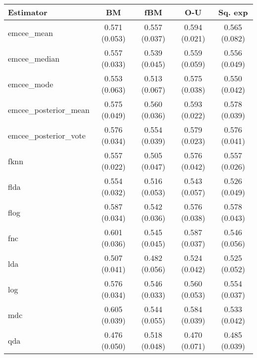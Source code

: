 \begin{table}[htbp!]
  \centering
  \begin{tabular}{lcccc}
\toprule
            \textbf{Estimator} &            \textbf{BM} &           \textbf{fBM} &           \textbf{O-U} &        \textbf{Sq. exp} \\
\midrule

          emcee\_mean & 0.571 (0.053) & 0.557 (0.037) & 0.594 (0.021) & 0.565 (0.082) \\
        emcee\_median & 0.557 (0.033) & 0.539 (0.045) & 0.559 (0.059) & 0.556 (0.049) \\
          emcee\_mode & 0.553 (0.063) & 0.513 (0.067) & 0.575 (0.038) & 0.550 (0.042) \\
emcee\_posterior\_mean & 0.575 (0.049) & 0.560 (0.036) & 0.593 (0.022) & 0.578 (0.039) \\
emcee\_posterior\_vote & 0.576 (0.034) & 0.554 (0.039) & 0.579 (0.023) & 0.576 (0.041) \\
                fknn & 0.557 (0.022) & 0.505 (0.047) & 0.576 (0.042) & 0.557 (0.026) \\
                flda & 0.554 (0.032) & 0.516 (0.053) & 0.543 (0.057) & 0.526 (0.049) \\
                flog & 0.587 (0.034) & 0.542 (0.036) & 0.576 (0.038) & 0.578 (0.043) \\
                 fnc & 0.601 (0.036) & 0.545 (0.045) & 0.587 (0.037) & 0.546 (0.056) \\
                 lda & 0.507 (0.041) & 0.482 (0.056) & 0.524 (0.042) & 0.525 (0.052) \\
                 log & 0.576 (0.034) & 0.546 (0.033) & 0.560 (0.053) & 0.554 (0.037) \\
                 mdc & 0.605 (0.039) & 0.544 (0.055) & 0.584 (0.039) & 0.533 (0.042) \\
                 qda & 0.476 (0.050) & 0.518 (0.048) & 0.470 (0.071) & 0.485 (0.039) \\


\end{tabular}
\end{table}
